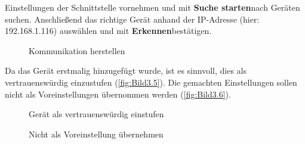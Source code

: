 Einstellungen der Schnittstelle vornehmen und mit \glqq\textbf{Suche starten}\grqq\:nach Geräten suchen. Anschließend das richtige Gerät anhand der IP-Adresse (hier: 192.168.1.116) auswählen und mit \glqq\textbf{Erkennen}\grqq\:bestätigen.
\begin{figure}[H]
   \centering
   \caption[Kommunikation herstellen]{Kommunikation herstellen}
   \label{fig:Bild3.4}
\end{figure}

Da das Gerät erstmalig hinzugefügt wurde, ist es sinnvoll, dies als vertrauenswürdig einzustufen (\autoref{fig:Bild3.5}). Die gemachten Einstellungen sollen nicht als Voreinstellungen übernommen werden (\autoref{fig:Bild3.6}).  
\begin{figure}[H]
   \centering
   \caption[Gerät als vertrauenswürdig einstufen]{Gerät als vertrauenswürdig einstufen}
   \label{fig:Bild3.5}
\end{figure}

\begin{figure}[H]
   \centering
   \caption[Nicht als Vorteinstellung übernehmen]{Nicht als Voreinstellung übernehmen}
   \label{fig:Bild3.6}
\end{figure}

